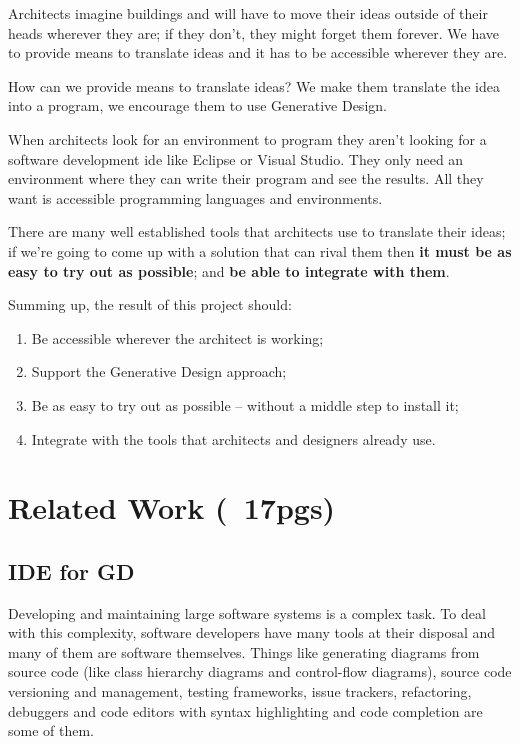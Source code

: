 \documentclass{./llncs2e/llncs}
\begin{document}
	Architects imagine buildings and will have to move their ideas outside of their heads wherever they are; if they don't, they might forget them forever. 
	We have to provide means to translate ideas and it has to be accessible wherever they are.

	How can we provide means to translate ideas? We make them translate the idea into a program, we encourage them to use Generative Design.

	When architects look for an environment to program they aren't looking for a software development \ac{ide} like Eclipse or Visual Studio. 
	They only need an environment where they can write their program and see the results. 
	All they want is accessible programming languages and environments.

	There are many well established tools that architects use to translate their ideas; 
	if we're going to come up with a solution that can rival them then \textbf{it must be as easy to try out as possible}; 
	and \textbf{be able to integrate with them}.

	Summing up, the result of this project should:
	\begin{enumerate}
		\item Be accessible wherever the architect is working; \label{obj:access}
		\item Support the Generative Design approach; \label{obj:gen-design}
		\item Be as easy to try out as possible -- without a middle step to install it; \label{obj:no-install}
		\item Integrate with the tools that architects and designers already use.\label{obj:inter-op}
	\end{enumerate}


\section{Related Work (~17pgs)}

\subsection{IDE for GD}
	Developing and maintaining large software systems is a complex task.
	To deal with this complexity, software developers have many tools at their disposal and many of them are software themselves.
	Things like generating diagrams from source code (like class hierarchy diagrams and control-flow diagrams), source code versioning and management, testing frameworks, issue trackers, refactoring, debuggers and code editors with syntax highlighting and code completion are some of them.
\end{document}
